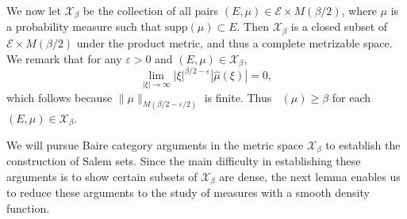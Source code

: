 \documentclass[dvipsnames,letterpaper,12pt]{article}
\numberwithin{equation}{section}
\DeclareMathOperator{\fordim}{\dim_{\mathbf{F}}}
\newtheorem{theorem}{Theorem}
\numberwithin{theorem}{section}
\begin{document}
We now let $\mathcal{X}_\beta$ be the collection of all pairs $(E,\mu) \in \mathcal{E} \times M(\beta/2)$, where $\mu$ is a probability measure such that $\text{supp}(\mu) \subset E$. Then $\mathcal{X}_\beta$ is a closed subset of $\mathcal{E} \times M(\beta/2)$ under the product metric, and thus a complete metrizable space. We remark that for any $\varepsilon > 0$ and $(E,\mu) \in \mathcal{X}_\beta$,
%
\begin{equation} \label{equationGFSCSC4}
    \lim_{|\xi| \to \infty} |\xi|^{\beta/2 - \varepsilon} |\widehat{\mu}(\xi)| = 0,
\end{equation}
%
which follows because $\| \mu \|_{M(\beta/2 - \varepsilon/2)}$ is finite. Thus $\fordim(\mu) \geq \beta$ for each $(E,\mu) \in \mathcal{X}_\beta$.

\begin{comment}
\begin{theorem}
    $\mathcal{X}$ is a closed subset of $\mathcal{E} \times M(\beta)$.
\end{theorem}
\begin{proof}
    Suppose $\{ (E_k,\mu_k) \}$ is a sequence of elements of $\mathcal{X}$ converging to some tuple $(E,\mu) \in \mathcal{E} \times M(\beta)$. Fix $\varepsilon > 0$. Since $E_k \to E$ in the Hausdorff dimension, there exists $k_0$ such that for $k \geq k_0$, $E_k \subset E(\varepsilon)$. Since $\mu_k \to \mu$ weakly, this implies that $\mu$ is a probability measure, and that $\text{supp}(\mu) \subset E(\varepsilon)$. Taking $\varepsilon \to 0$ shows that $\text{supp}(\mu) \subset E$. Again for a fixed $\varepsilon > 0$, applying the triangle inequality and the reverse triangle inequality combined with \eqref{equationGFSCSC4} applied to $\mu_k$, we conclude
    \[ \lim_{|\xi| \to \infty} |\xi|^{\beta/2 - \varepsilon} |\widehat{\mu}(\xi)| = \lim_{|\xi| \to \infty} |\xi|^{\beta/2 - \varepsilon} |\widehat{\mu}(\xi) - \widehat{\mu_k}(\xi)| \leq \| \mu - \mu_k \|_{M(\beta,\varepsilon)}. \]
    Taking $k \to \infty$ shows that
    \[ \lim_{|\xi| \to \infty} |\xi|^{\beta/2 - \varepsilon} |\widehat{\mu}(\xi)| = 0, \]
    which completes the proof.
\end{proof}
\end{comment}

We will pursue Baire category arguments in the metric space $\mathcal{X}_\beta$ to establish the construction of Salem sets. Since the main difficulty in establishing these arguments is to show certain subsets of $\mathcal{X}_\beta$ are dense, the next lemma enables us to reduce these arguments to the study of measures with a smooth density function.
\end{document}
